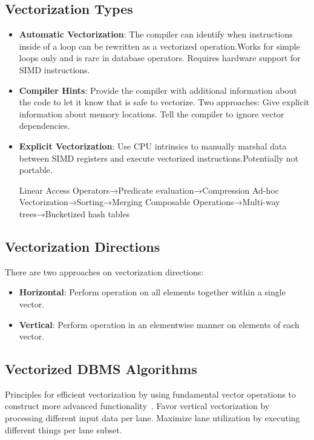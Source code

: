 \documentclass[11pt]{article}
\begin{document}
\subsection*{Vectorization Types}
\begin{itemize}
	\item  
	\textbf{Automatic Vectorization}:
	The compiler can identify when instructions inside of a loop can be rewritten as a vectorized operation.Works for simple loops only and is rare in database operators. Requires hardware support for SIMD instructions.
	
	\item  
	\textbf{Compiler Hints}:
	Provide the compiler with additional information about the code to let it know that is safe to vectorize.
	Two approaches:
	Give explicit information about memory locations.
	Tell the compiler to ignore vector dependencies.
	
	\item  
	\textbf{Explicit Vectorization}:
	Use CPU intrinsics to manually marshal data between SIMD registers and execute vectorized instructions.Potentially not portable.
	
	Linear Access Operators→Predicate evaluation→Compression
	Ad-hoc Vectorization→Sorting→Merging
	Composable Operations→Multi-way trees→Bucketized hash tables
\end{itemize}

\subsection*{Vectorization Directions}
There are two approaches on vectorization directions:
\begin{itemize}
	\item  
	\textbf{Horizontal}:
	Perform operation on all elements together within a single vector.
	
	\item 
	\textbf{Vertical}:
	Perform operation in an elementwise manner on elements of each vector.
\end{itemize}

\subsection*{Vectorized DBMS Algorithms} 
Principles for efficient vectorization by using fundamental vector operations to construct more advanced functionality~\cite{Polychroniou2015}. Favor vertical vectorization by processing different input data per lane. Maximize lane utilization by executing different things per lane subset.
\end{document}
